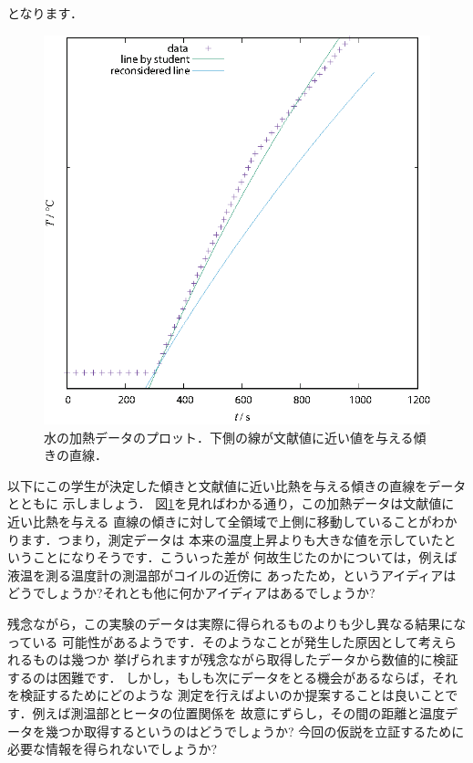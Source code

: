 \documentclass[a4paper,10pt]{jarticle}
\begin{document}
\noindent
となります．
%
\begin{figure}[ht]
\begin{center}
 \includegraphics[scale=0.8]{hcap.eps}
 \caption{水の加熱データのプロット．下側の線が文献値に近い値を与える傾きの直線．}
 \label{hcap-plt}
\end{center}
\end{figure}

以下にこの学生が決定した傾きと文献値に近い比熱を与える傾きの直線をデータとともに
示しましょう．
図\ref{hcap-plt}を見ればわかる通り，この加熱データは文献値に近い比熱を与える
直線の傾きに対して全領域で上側に移動していることがわかります．つまり，測定データは
本来の温度上昇よりも大きな値を示していたということになりそうです．こういった差が
何故生じたのかについては，例えば液温を測る温度計の測温部がコイルの近傍に
あったため，というアイディアはどうでしょうか?それとも他に何かアイディアはあるでしょうか?

\newpage
残念ながら，この実験のデータは実際に得られるものよりも少し異なる結果になっている
可能性があるようです．そのようなことが発生した原因として考えられるものは幾つか
挙げられますが残念ながら取得したデータから数値的に検証するのは困難です．
しかし，もしも次にデータをとる機会があるならば，それを検証するためにどのような
測定を行えばよいのか提案することは良いことです．例えば測温部とヒータの位置関係を
故意にずらし，その間の距離と温度データを幾つか取得するというのはどうでしょうか?
今回の仮説を立証するために必要な情報を得られないでしょうか?
\end{document}
